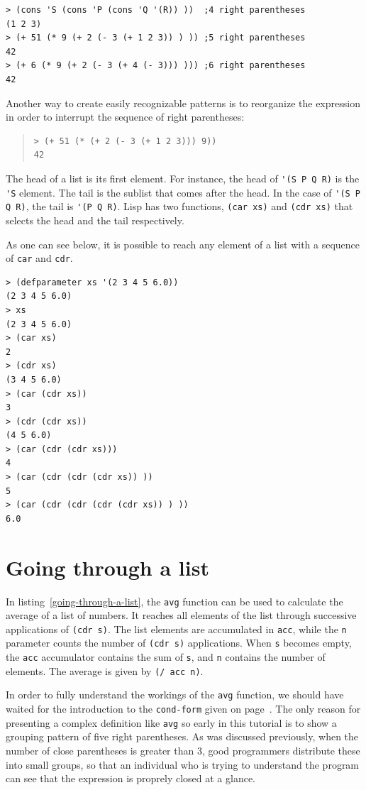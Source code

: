 \documentclass[a4paper,12pt]{book}
\begin{document}
\begin{verbatim}
> (cons 'S (cons 'P (cons 'Q '(R)) ))  ;4 right parentheses
(1 2 3)
> (+ 51 (* 9 (+ 2 (- 3 (+ 1 2 3)) ) )) ;5 right parentheses
42 
> (+ 6 (* 9 (+ 2 (- 3 (+ 4 (- 3))) ))) ;6 right parentheses
42
\end{verbatim}

Another way to create easily recognizable patterns  is to
reorganize the expression in order to interrupt the sequence
of right parentheses:
\begin{quote}
\begin{verbatim}
> (+ 51 (* (+ 2 (- 3 (+ 1 2 3))) 9))
42
\end{verbatim}
\end{quote}

The head of a list is its first element. For instance, the head of
\verb|'(S P Q R)| is the \verb|'S| element. The tail is the sublist
that comes after the head. In the case of \verb|'(S P Q R)|, the tail
is \verb|'(P Q R)|. Lisp has two functions, \verb|(car xs)| and
\verb|(cdr xs)| that selects the head and the tail respectively.

As one can see below, it is possible to reach any element of a list
with a sequence of \verb|car| and \verb|cdr|.
\begin{verbatim}
> (defparameter xs '(2 3 4 5 6.0))
(2 3 4 5 6.0)
> xs
(2 3 4 5 6.0)
> (car xs)
2
> (cdr xs)
(3 4 5 6.0)
> (car (cdr xs))
3
> (cdr (cdr xs))
(4 5 6.0)
> (car (cdr (cdr xs)))
4
> (car (cdr (cdr (cdr xs)) ))
5
> (car (cdr (cdr (cdr (cdr xs)) ) ))
6.0
\end{verbatim}

\section{Going through a list}\label{sec:average}
In listing~\ref{going-through-a-list},
the \verb|avg| function can be used to
calculate the average of a list of numbers.
It reaches all elements of the list
through successive applications
of  \verb|(cdr s)|.
The list elements are accumulated in
\verb|acc|,
while the \verb|n| parameter counts
the number of \verb|(cdr s)| applications.
When  \verb|s| becomes empty, the \verb|acc|
accumulator contains the sum of \verb|s|, and \verb|n|
contains the number of elements. The average
is given by \verb|(/ acc n)|. 

In order to fully understand the workings
of the \verb|avg| function, we should have
waited for the introduction to the \verb|cond-form|
given on page~\pageref{page:cond-form}.
The only reason for presenting
a complex definition like \verb|avg|
so early in this tutorial is
to show a grouping pattern of five
right parentheses. As was discussed
previously, when the number of close
parentheses is greater than 3, good
programmers distribute these into small
groups, so that an individual who is
trying to understand the program
can see that the expression is
proprely closed at a glance.
\end{document}
